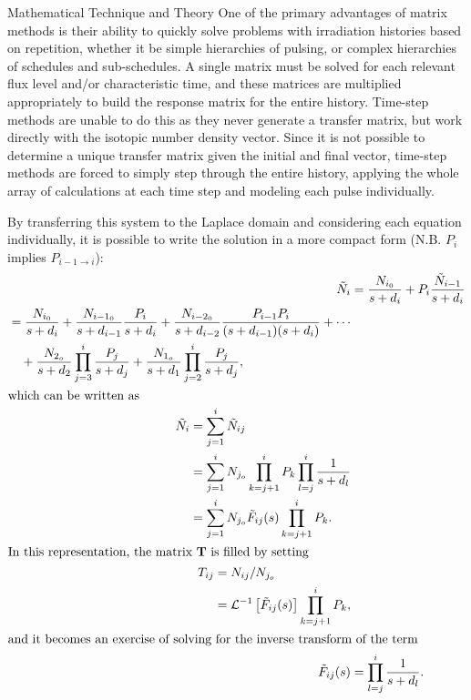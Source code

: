 \begin{chapter}{Mathematical Technique and Theory\label{chap:math}}
  One of the primary advantages of matrix methods is their ability to
  quickly solve problems with irradiation histories based on
  repetition, whether it be simple hierarchies of pulsing, or complex
  hierarchies of schedules and sub-schedules.  A single matrix must be
  solved for each relevant flux level and/or characteristic time, and
  these matrices are multiplied appropriately to build the response
  matrix for the entire history.  Time-step methods are unable to do
  this as they never generate a transfer matrix, but work directly
  with the isotopic number density vector.  Since it is not possible
  to determine a unique transfer matrix given the initial and final
  vector, time-step methods are forced to simply step through the
  entire history, applying the whole array of calculations at each
  time step and modeling each pulse individually.
  
  By transferring this system to the Laplace domain and considering
  each equation individually, it is possible to write the solution in
  a more compact form (N.B. $P_{i}$ implies $P_{i-1 \rightarrow i}$):
  \begin{align}
    \tilde{N}_i &= \frac{N_{i_0}}{s+d_i} + P_i
    \frac{\tilde{N}_{i-1}}{s+d_i}\\
    \begin{split}
      &= \frac{N_{i_0}}{s+d_i} + 
      \frac{N_{i-1_0}}{s+d_{i-1}}\frac{P_i}{s+d_i} +
      \frac{N_{i-2_0}}{s+d_{i-2}}\frac{P_{i-1}P_i}{(s+d_{i-1})(s+d_i)} + 
      \cdots\\
      &\quad+\frac{N_{2_o}}{s+d_2}\prod_{j=3}^i\frac{P_{j}}{s+d_{j}} +
      \frac{N_{1_o}}{s+d_1}\prod_{j=2}^i\frac{P_j}{s+d_{j}},\\
    \end{split}\\
    \intertext{which can be written as}
    \begin{split}
      \tilde{N}_i & = \sum_{j=1}^i \tilde{N}_{ij} \\
      & = \sum_{j=1}^i N_{j_o} \prod_{k=j+1}^i P_k \prod_{l=j}^i
      \frac{1}{s+d_l} \\
      & = \sum_{j=1}^i N_{j_o} \tilde{F}_{ij}(s)
      \prod_{k=j+1}^i P_k.\label{eq:math.full.prob}\\
    \end{split}\\
    \intertext{In this representation, the matrix \mbox{$\mathbf{T}$} is filled by setting}
    \begin{split}
      T_{ij} &= N_{ij}/N_{j_o}\\ &=
      \mathcal{L}^{-1}\left[\tilde{F}_{ij}(s)\right] \prod_{k=j+1}^{i}
      P_k,\\
    \end{split}\label{eq:math.intro.filler}\\
    \intertext{and it becomes an exercise of solving for the inverse
      transform of the term}
    \tilde{F}_{ij}(s) &= \prod_{l=j}^i \frac{1}{s+d_l}\label{eq:math.root.prob}.
  \end{align}
  

\end{chapter}
